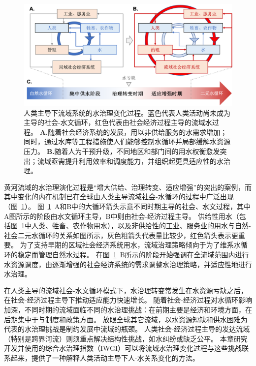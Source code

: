 \begin{figure}[!bp]
	\includegraphics[width=\textwidth]{img/ch4/ch4_transition.png}
	\caption[人类主导下流域系统的水治理阶段过渡]{
		人类主导下流域系统的水治理变化过程。蓝色代表人类活动尚未成为主导的社会-水文循环，红色代表由社会经济过程主导的流域水过程。
        \textbf{A.}随着社会经济系统的发展，用以非供给服务的水需求增加；同时，通过水库等工程措施使人们能够控制水循环并局部缓解水资源压力。
        \textbf{B.}随着人为干预升级，不同地区和部门间的用水权衡愈发突出；流域亟需提升利用效率和调度能力，并组织起更具适应性的水治理。
	}\label{fig:summary}
\end{figure}

黄河流域的水治理演化过程是“增大供给、治理转变、适应增强”的突出的案例，而其中变化的内在机制已在全球由人类主导流域社会-水循环的过程中广泛出现（图~\ref{fig:summary}）。
图~\ref{fig:summary}~A和B中的大循环箭头示意不同时期主导的社会、水文过程，其中A图所示的阶段由水文循环主导，B中则由社会-经济过程主导。
供给性用水（包括图~\ref{fig:summary}中人类、牲畜、农作物用水），以及非供给性的工业、服务业的用水与自然-社会二元水循环的关系如图所示，灰色粗箭头代表量比较少，红色箭头表示更重要。
为了支持早期的区域社会经济系统用水，流域治理策略倾向于为了维系水循环的稳定而管理自然水过程。
在图~\ref{fig:summary}~B所示的阶段开始强调在全流域范围内进行水资源调度，由逐渐增强的社会经济系统的需求调整水治理策略，并适应性地进行水治理。

在人类主导的流域社会-水文循环模式下，水治理转变常发生在水资源亏缺之后，在社会-经济过程主导下推动适应能力快速增长。
随着社会-经济过程对水循环影响加深，不同时期的流域面临不同的水治理挑战：在前期主要是经济和环境方面，在后期集中于与制度和政策方面。
放眼全球其它流域，以水资源短缺和供水困难为代表的水治理挑战是制约发展中流域的瓶颈\cite{allan2019,speed2013,liu2012a}。
人类社会-经济过程主导的发达流域（特别是跨界河流）则须重点解决结构性挑战，如水纠纷或缺乏公平\cite{mirumachi2015}。
本章研究开发并使用的综合水治理指数（IWGI）可以将流域水治理变化过程与这些挑战联系起来，提供了一种解释人类活动主导下人-水关系变化的方法。


